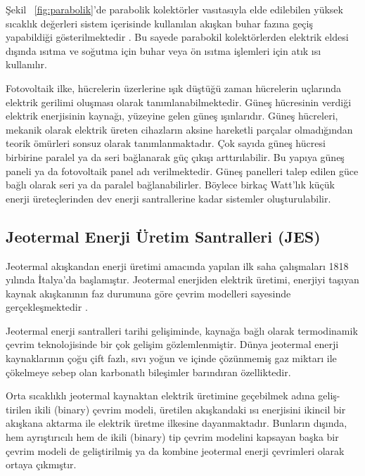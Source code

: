 Şekil ~\ref{fig:parabolik}'de parabolik kolektörler vasıtasıyla elde edilebilen yüksek sıcaklık değerleri sistem içerisinde kullanılan akışkan buhar fazına geçiş yapabildiği gösterilmektedir \cite{AZADGILANI2021116756}. Bu sayede parabokil kolektörlerden elektrik eldesi dışında ısıtma ve soğutma için buhar veya ön ısıtma işlemleri için atık ısı kullanılır.

Fotovoltaik ilke, hücrelerin üzerlerine ışık düştüğü zaman hücrelerin uçlarında elektrik gerilimi oluşması olarak tanımlanabilmektedir. Güneş hücresinin verdiği elektrik enerjisinin kaynağı, yüzeyine gelen güneş ışınlarıdır. Güneş hücreleri, mekanik olarak elektrik üreten cihazların aksine hareketli parçalar olmadığından teorik ömürleri sonsuz olarak tanımlanmaktadır. Çok sayıda güneş hücresi birbirine paralel ya da seri bağlanarak güç çıkışı arttırılabilir. Bu yapıya güneş paneli ya da fotovoltaik panel adı verilmektedir. Güneş panelleri talep edilen güce bağlı olarak seri ya da paralel bağlanabilirler. Böylece birkaç Watt’lık küçük enerji üreteçlerinden dev enerji santrallerine kadar sistemler oluşturulabilir\cite{ramakumar1993photovoltaic}.







\subsection{Jeotermal Enerji Üretim Santralleri (JES) }



Jeotermal akışkandan enerji üretimi amacında yapılan ilk saha çalışmaları 1818 yılında İtalya'da başlamıştır. Jeotermal enerjiden elektrik üretimi, enerjiyi taşıyan kaynak akışkanının faz durumuna göre çevrim modelleri sayesinde gerçekleşmektedir \cite{Jeotarih}. 

Jeotermal enerji santralleri tarihi gelişiminde, kaynağa bağlı olarak termodinamik çevrim teknolojisinde bir çok gelişim gözlemlenmiştir. Dünya jeotermal enerji kaynaklarının çoğu çift fazlı, sıvı yoğun ve içinde çözünmemiş gaz miktarı ile çökelmeye sebep olan karbonatlı bileşimler barındıran özelliktedir.

Orta sıcaklıklı jeotermal kaynaktan elektrik üretimine geçebilmek adına geliş-tirilen ikili (binary) çevrim modeli, üretilen akışkandaki ısı enerjisini ikincil bir akışkana aktarma ile elektrik üretme ilkesine dayanmaktadır. Bunların dışında, hem ayrıştırıcılı hem de ikili (binary) tip çevrim modelini kapsayan başka bir çevrim modeli de geliştirilmiş ya da kombine jeotermal enerji çevrimleri olarak ortaya çıkmıştır.



